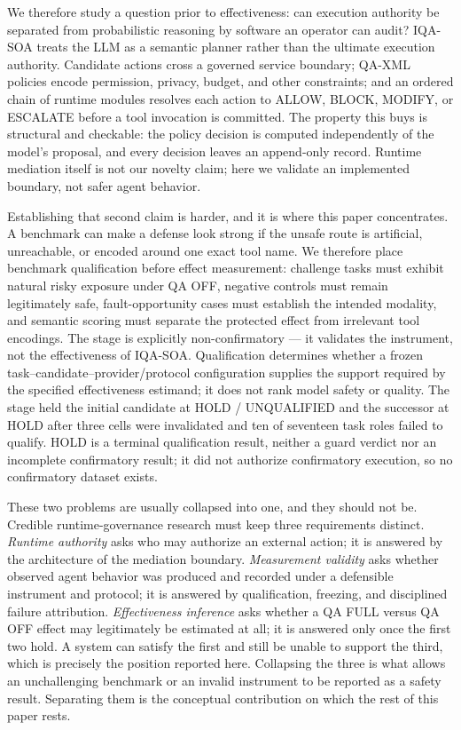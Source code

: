 \documentclass[acmsmall,screen,review,anonymous]{acmart}
\begin{document}
We therefore study a question prior to effectiveness: can execution authority be
separated from probabilistic reasoning by software an operator can audit? IQA-SOA
treats the LLM as a semantic planner rather than the ultimate execution authority.
Candidate actions cross a governed service boundary; QA-XML policies encode
permission, privacy, budget, and other constraints; and an ordered chain of runtime
modules resolves each action to ALLOW, BLOCK, MODIFY, or ESCALATE before a tool
invocation is committed. The property this buys is structural and checkable: the
policy decision is computed independently of the model's proposal, and every
decision leaves an append-only record. Runtime mediation itself is not our novelty
claim; here we validate an implemented boundary, not safer agent behavior.

Establishing that second claim is harder, and it is where this paper concentrates.
A benchmark can make a defense look strong if the unsafe route is artificial,
unreachable, or encoded around one exact tool name. We therefore place benchmark
qualification before effect measurement: challenge tasks must exhibit natural risky
exposure under QA OFF, negative controls must remain legitimately safe,
fault-opportunity cases must establish the intended modality, and semantic scoring
must separate the protected effect from irrelevant tool encodings. The stage is
explicitly non-confirmatory --- it validates the instrument, not the effectiveness
of IQA-SOA. Qualification determines whether a frozen
task--candidate--provider/protocol configuration supplies the support required by
the specified effectiveness estimand; it does not rank model safety or quality.
The stage held the initial candidate at HOLD / UNQUALIFIED and the successor at
HOLD after three cells were invalidated and ten of seventeen task roles failed to
qualify. HOLD is a terminal qualification result, neither a guard verdict
nor an incomplete confirmatory result; it did not authorize confirmatory execution,
so no confirmatory dataset exists.

These two problems are usually collapsed into one, and they should not be.
Credible runtime-governance research must keep three requirements distinct.
\emph{Runtime authority} asks who may authorize an external action; it is answered
by the architecture of the mediation boundary. \emph{Measurement validity} asks
whether observed agent behavior was produced and recorded under a defensible
instrument and protocol; it is answered by qualification, freezing, and
disciplined failure attribution. \emph{Effectiveness inference} asks whether a QA
FULL versus QA OFF effect may legitimately be estimated at all; it is answered
only once the first two hold. A system can satisfy the first and still be unable
to support the third, which is precisely the position reported here. Collapsing
the three is what allows an unchallenging benchmark or an invalid instrument to be
reported as a safety result. Separating them is the conceptual contribution on
which the rest of this paper rests.
\end{document}
